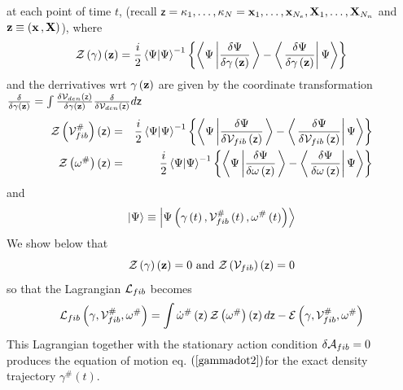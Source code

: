 at each point of time $t$, (recall ${\sf z}=\kappa _{1},\ldots ,\kappa _{N}=%
{\bf x}_{1},\ldots ,{\bf x}_{N_{e}},{\bf X}_{1},\ldots ,{\bf X}_{N_{n}}$ and 
${\bf z}\equiv ({\bf x}\,,{\bf X})$), where 
\begin{equation}
{\cal Z}\left( {\cal \gamma }\right) \left( {\bf z}\right) =\frac{i}{2}%
\left\langle \Psi |\Psi \right\rangle ^{-1}\left\{ \left\langle \Psi \left| 
\frac{\delta \Psi }{\delta {\cal \gamma }\left( {\bf z}\right) }\right.
\right\rangle -\left\langle \left. \frac{\delta \Psi }{\delta {\cal \gamma }%
\left( {\bf z}\right) }\right| \Psi \right\rangle \right\}
\end{equation}%
and the derrivatives wrt $\gamma \left( {\bf z}\right) $ are given by the
coordinate transformation $\frac{\delta }{\delta \gamma \left( {\bf z}%
\right) }=\int \frac{\delta {\cal V}_{den}\left( {\sf z}\right) }{\delta
\gamma \left( {\bf z}\right) }\frac{\delta }{\delta {\cal V}_{den}\left( 
{\sf z}\right) }d{\sf z}$%
\begin{eqnarray}
{\cal Z}\left( {\cal V}_{fib}^{\#}\right) \left( {\sf z}\right) &=&\frac{i}{2%
}\left\langle \Psi |\Psi \right\rangle ^{-1}\left\{ \left\langle \Psi \left| 
\frac{\delta \Psi }{\delta {\cal V}_{fib}\left( {\sf z}\right) }\right.
\right\rangle -\left\langle \left. \frac{\delta \Psi }{\delta {\cal V}%
_{fib}\left( {\sf z}\right) }\right| \Psi \right\rangle \right\}  \nonumber
\\
{\cal Z}\left( \omega ^{\#}\right) \left( {\sf z}\right) &=&\frac{i}{2}%
\left\langle \Psi |\Psi \right\rangle ^{-1}\left\{ \left\langle \Psi \left| 
\frac{\delta \Psi }{\delta \omega \left( {\sf z}\right) }\right.
\right\rangle -\left\langle \left. \frac{\delta \Psi }{\delta \omega \left( 
{\sf z}\right) }\right| \Psi \right\rangle \right\}
\end{eqnarray}%
and 
\begin{equation}
\left| \Psi \right\rangle \equiv \left| \Psi \left( \gamma \left( t\right) ,%
{\cal V}_{fib}^{\#}\left( t\right) ,\omega ^{\#}\left( t\right) \right)
\right\rangle
\end{equation}%
We show below that 
\begin{equation}
{\cal Z}\left( {\cal \gamma }\right) \left( {\bf z}\right) =0\text{ and }%
{\cal Z}\left( {\cal V}_{fib}\right) \left( {\sf z}\right) =0
\end{equation}%
so that the Lagrangian ${\cal L}_{fib}$ becomes 
\begin{equation}
{\cal L}_{fib}\left( \gamma ,{\cal V}_{fib}^{\#},\omega ^{\#}\right) =\int 
{\cal \dot{\omega}}^{\#}\left( {\sf z}\right) {\cal Z}\left( {\cal \omega }%
^{\#}\right) \left( {\sf z}\right) d{\sf z}-{\cal E}\left( \gamma ,{\cal V}%
_{fib}^{\#},{\cal \omega }^{\#}\right)
\end{equation}%
This Lagrangian together with the stationary action condition $\delta {\cal A%
}_{fib}=0$ produces the equation of motion eq. $\left( \ref{gammadot2}%
\right) $for the exact density trajectory $\gamma ^{\#}\left( t\right) $.

